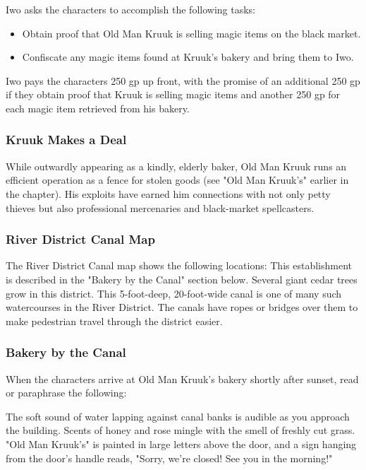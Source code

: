 \documentclass[10pt,a4,twoside,twocolumn,openany,nodeprecatedcode]{dndbook}
\begin{document}
Iwo asks the characters to accomplish the following tasks:
\begin{itemize}

\item Obtain proof that Old Man Kruuk is selling magic items on the black market.
\item Confiscate any magic items found at Kruuk's bakery and bring them to Iwo.
\end{itemize}


Iwo pays the characters 250 gp up front, with the promise of an additional 250 gp if they obtain proof that Kruuk is selling magic items and another 250 gp for each magic item retrieved from his bakery.
\subsubsection{Kruuk Makes a Deal}
While outwardly appearing as a kindly, elderly baker, Old Man Kruuk runs an efficient operation as a fence for stolen goods (see "Old Man Kruuk's" earlier in the chapter). His exploits have earned him connections with not only petty thieves but also professional mercenaries and black-market spellcasters.
\subsubsection{River District Canal Map}
The River District Canal map shows the following locations:
{{This establishment is described in the "Bakery by the Canal" section below.}}
{{Several giant cedar trees grow in this district.}}
{{This 5-foot-deep, 20-foot-wide canal is one of many such watercourses in the River District. The canals have ropes or bridges over them to make pedestrian travel through the district easier.}}
\subsubsection{Bakery by the Canal}
When the characters arrive at Old Man Kruuk's bakery shortly after sunset, read or paraphrase the following:
\begin{DndReadAloud}{}
The soft sound of water lapping against canal banks is audible as you approach the building. Scents of honey and rose mingle with the smell of freshly cut grass. "Old Man Kruuk's" is painted in large letters above the door, and a sign hanging from the door's handle reads, "Sorry, we're closed! See you in the morning!"
\end{DndReadAloud}
\end{document}

